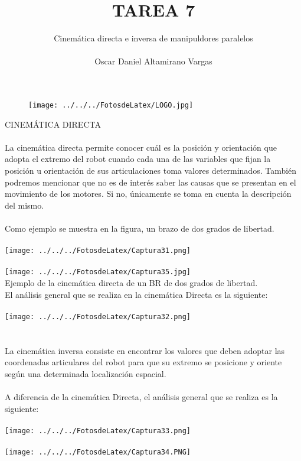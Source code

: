 \documentclass[12pt]{article}
\title{TAREA 7}
\author{Cinemática directa e inversa de manipuldores paralelos \\ \\ Oscar Daniel Altamirano Vargas\\}
\begin{document}
 
\maketitle
\begin{figure}[hbtp]
\centering
\texttt{[image: ../../../FotosdeLatex/LOGO.jpg]}
\end{figure}
\pagebreak
CINEMÁTICA DIRECTA
\\ \\
La cinemática directa permite conocer cuál es la posición y orientación que adopta el extremo del robot cuando cada una de las variables que fijan la posición u orientación de sus articulaciones toma valores determinados.
También podremos mencionar que no es de interés saber las causas que se presentan en el movimiento de los motores. Si no, únicamente se toma en cuenta la descripción del mismo. \cite{we-robotica2013}
 \\ \\
Como ejemplo se muestra en la figura, un brazo de dos grados de libertad.\\ \\
\texttt{[image: ../../../FotosdeLatex/Captura31.png]} \\ \\ 
\texttt{[image: ../../../FotosdeLatex/Captura35.jpg]}  \\
Ejemplo de la cinemática directa de un BR de dos grados de libertad.\\
El análisis general que se realiza en la cinemática Directa es la siguiente:\\ \\

\texttt{[image: ../../../FotosdeLatex/Captura32.png]} \\ \\ \\
La cinemática inversa consiste en encontrar los valores que deben adoptar las coordenadas articulares del robot para que su extremo se posicione y oriente según una determinada localización espacial.  \\ \\

A diferencia de la cinemática Directa, el análisis general que se realiza es la siguiente: \\ \\

\texttt{[image: ../../../FotosdeLatex/Captura33.png]} \\ \\
\texttt{[image: ../../../FotosdeLatex/Captura34.PNG]} \\
\pagebreak
\nocite{*} 


\end{document}
